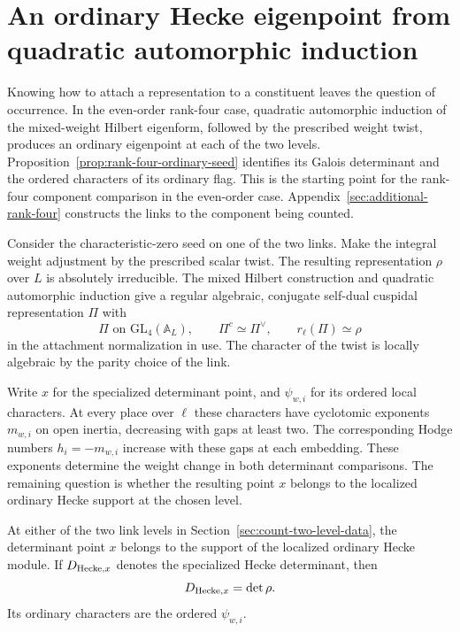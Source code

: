 \section{An ordinary Hecke eigenpoint from quadratic automorphic induction}
\label{sec:count-two-seed-specialization}

Knowing how to attach a representation to a constituent leaves the question of occurrence. In the even-order rank-four case, quadratic automorphic induction of the mixed-weight Hilbert eigenform, followed by the prescribed weight twist, produces an ordinary eigenpoint at each of the two levels. Proposition~\ref{prop:rank-four-ordinary-seed} identifies its Galois determinant and the ordered characters of its ordinary flag. This is the starting point for the rank-four component comparison in the even-order case. Appendix~\ref{sec:additional-rank-four} constructs the links to the component being counted.

Consider the characteristic-zero seed on one of the two links.
Make the integral weight adjustment by the prescribed scalar
twist. The resulting representation \(\rho\) over \(L\) is
absolutely irreducible. The mixed Hilbert construction and quadratic automorphic induction give a regular algebraic, conjugate self-dual cuspidal representation \(\Pi\) with
\[
 \Pi\text{ on }\mathrm{GL}_4(\mathbb A_L),\qquad \Pi^c\simeq\Pi^\vee,\qquad r_\ell(\Pi)\simeq\rho
\]
in the attachment normalization in use. The character of the twist
is locally algebraic by the parity choice of the link.

Write
\(x\) for the specialized determinant point, and \(\psi_{w,i}\)
for its ordered local characters. At every place over \(\ell\)
these characters have cyclotomic exponents \(m_{w,i}\) on open
inertia, decreasing with gaps at least two. The corresponding
Hodge numbers \(h_i=-m_{w,i}\) increase with these gaps at
each embedding. These exponents determine the weight change in both determinant comparisons. The remaining question is whether the resulting point \(x\) belongs to the localized ordinary Hecke support at the chosen level.

\begin{proposition}\label{prop:rank-four-ordinary-seed}
At either of the two link levels in Section~\ref{sec:count-two-level-data}, the determinant point
\(x\) belongs to the support of the localized ordinary Hecke
module. If \(D_{{\rm Hecke},x}\) denotes the specialized Hecke determinant, then 
\[
 D_{{\rm Hecke},x}=\det\rho.
\]
 Its ordinary characters are the ordered \(\psi_{w,i}\).
\end{proposition}


